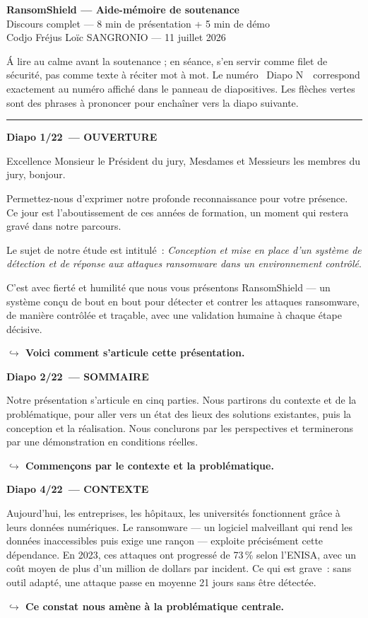 \documentclass[a4paper,11pt]{article}
\newcommand{\notehead}[2]{%
  \par\vspace{14pt}%
  {\color{white}\colorbox{primary}{\parbox{\dimexpr\linewidth-12pt}{\vspace{3pt}%
    \bfseries\large Diapo #1~--- #2\vspace{3pt}}}}%
  \par\vspace{6pt}%
}
\newcommand{\pivot}[1]{%
  \par\vspace{3pt}%
  {\color{transition}\small\bfseries $\hookrightarrow$ #1}%
}
\begin{document}
\begin{center}
  {\LARGE\bfseries\color{primary} RansomShield --- Aide-m\'emoire de soutenance}\\[4pt]
  {\large\color{textdark} Discours complet --- 8 min de pr\'esentation + 5 min de d\'emo}\\[2pt]
  {\small\color{muted} Codjo Fr\'ejus Lo\"ic SANGRONIO --- 11 juillet 2026}
\end{center}
\vspace{6pt}
{\color{muted}\small\'A lire au calme avant la soutenance ; en s\'eance, s'en servir comme filet de s\'ecurit\'e, pas comme texte \`a r\'eciter mot \`a mot. Le num\'ero \guillemotleft~Diapo N~\guillemotright\ correspond exactement au num\'ero affich\'e dans le panneau de diapositives. Les \textcolor{transition}{fl\`eches vertes} sont des phrases \`a prononcer pour enchaîner vers la diapo suivante.}
\vspace{2pt}
\hrule

\notehead{1/22}{OUVERTURE}
Excellence Monsieur le Président du jury, Mesdames et Messieurs les membres du jury, bonjour.

Permettez-nous d'exprimer notre profonde reconnaissance pour votre présence.
  Ce jour est l'aboutissement de ces années de formation, un moment qui restera gravé dans notre parcours.

Le sujet de notre étude est intitulé~: \textit{Conception et mise en place d'un système de détection
  et de réponse aux attaques ransomware dans un environnement contrôlé}.

C'est avec fierté et humilité que nous vous présentons RansomShield --- un système conçu de bout en bout
  pour détecter et contrer les attaques ransomware, de manière contrôlée et traçable,
  avec une validation humaine à chaque étape décisive.
\pivot{Voici comment s'articule cette présentation.}

\notehead{2/22}{SOMMAIRE}
Notre présentation s'articule en cinq parties. Nous partirons du contexte et de la problématique,
  pour aller vers un état des lieux des solutions existantes, puis la conception et la réalisation.
  Nous conclurons par les perspectives et terminerons par une démonstration en conditions réelles.
\pivot{Commençons par le contexte et la problématique.}

\notehead{4/22}{CONTEXTE}
Aujourd'hui, les entreprises, les hôpitaux, les universités fonctionnent grâce à leurs données
  numériques. Le ransomware --- un logiciel malveillant qui rend les données inaccessibles puis
  exige une rançon --- exploite précisément cette dépendance. En 2023, ces attaques ont progressé
  de 73\,\% selon l'ENISA, avec un coût moyen de plus d'un million de dollars par incident.
  Ce qui est grave~: sans outil adapté, une attaque passe en moyenne 21 jours sans être détectée.
\pivot{Ce constat nous amène à la problématique centrale.}
\end{document}
